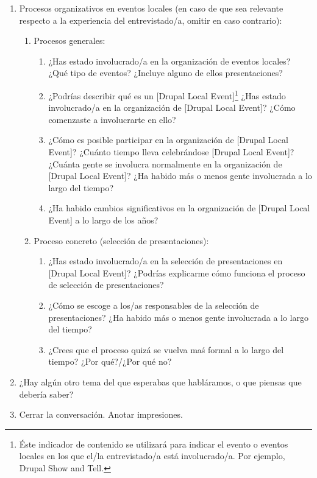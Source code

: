 \begin{enumerate}
		
	\item Procesos organizativos en eventos locales (en caso de que sea relevante respecto a la experiencia del entrevistado/a, omitir en caso contrario):
		\begin{enumerate}
			\item Procesos generales:
			\begin{enumerate}		
				\item ¿Has estado involucrado/a en la organización de eventos locales? ¿Qué tipo de eventos? ¿Incluye alguno de ellos presentaciones?
				\item ¿Podrías describir qué es un [Drupal Local Event]\footnote{Éste indicador de contenido se utilizará para indicar el evento o eventos locales en los que el/la entrevistado/a está involucrado/a. Por ejemplo, Drupal Show and Tell.} ¿Has estado involucrado/a en la organización de [Drupal Local Event]? ¿Cómo comenzaste a involucrarte en ello?
				\item ¿Cómo es posible participar en la organización de [Drupal Local Event]? ¿Cuánto tiempo lleva celebrándose [Drupal Local Event]? ¿Cuánta gente se involucra normalmente en la organización de [Drupal Local Event]? ¿Ha habido más o menos gente involucrada a lo largo del tiempo?	
				\item ¿Ha habido cambios significativos en la organización de [Drupal Local Event] a lo largo de los años?
			\end{enumerate}

			\item Proceso concreto (selección de presentaciones):
			\begin{enumerate}			
				\item ¿Has estado involucrado/a en la selección de presentaciones en [Drupal Local Event]? ¿Podrías explicarme cómo funciona el proceso de selección de presentaciones?
				\item ¿Cómo se escoge a los/as responsables de la selección de presentaciones? ¿Ha habido más o menos gente involucrada a lo largo del tiempo?
				\item ¿Crees que el proceso quizá se vuelva maś formal a lo largo del tiempo? ¿Por qué?/¿Por qué no?
			\end{enumerate}		

		\end{enumerate}	
	\item ¿Hay algún otro tema del que esperabas que habláramos, o que piensas que debería saber?
	\item Cerrar la conversación. Anotar impresiones.
\end{enumerate}